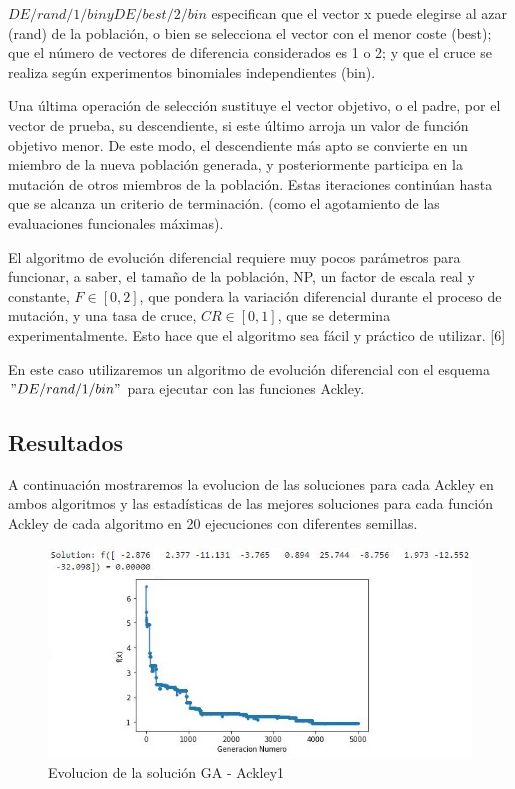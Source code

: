 \documentclass[10pt]{article}
\begin{document}
$ DE/rand/1/bin y DE/best/2/bin $ especifican que el vector x puede elegirse al azar (rand) de la población, o bien se selecciona el vector con el menor coste (best); que el número de vectores de diferencia considerados es 1 o 2; y que el cruce se realiza según experimentos binomiales independientes (bin).

Una última operación de selección sustituye el vector objetivo, o el padre, por el vector de prueba, su descendiente, si este último arroja un valor de función objetivo menor. De este modo, el descendiente más apto se convierte en un miembro de la nueva población generada, y posteriormente participa en la mutación de otros miembros de la población. Estas iteraciones continúan hasta que se alcanza un criterio de terminación. (como el agotamiento de las evaluaciones funcionales máximas).

El algoritmo de evolución diferencial requiere muy pocos parámetros para funcionar, a saber, el tamaño de la población, NP, un factor de escala real y constante, $F \in [0, 2] $, que pondera la variación diferencial durante el proceso de mutación, y una tasa de cruce, $ CR \in  [0, 1]$, que se determina experimentalmente. Esto hace que el algoritmo sea fácil y práctico de utilizar. [6]

En este caso utilizaremos un algoritmo de evolución diferencial con el esquema $ " DE/rand/1/bin " $ para ejecutar con las funciones Ackley.

\subsection{Resultados}%
A continuación mostraremos la evolucion de las soluciones para cada Ackley en ambos algoritmos y las estadísticas de las mejores soluciones para cada función Ackley de cada algoritmo en 20 ejecuciones con diferentes semillas.

\begin{figure}[H]
\centerline{\includegraphics{ack-1-ga.jpg}}
\caption{Evolucion de la solución GA - Ackley1}
\label{fig_1}
\end{figure}
\end{document}

